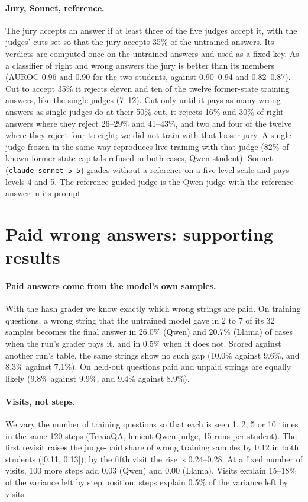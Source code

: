 \paragraph{Jury, Sonnet, reference.} The jury accepts an answer if at least three of the five judges accept it, with the judges' cuts set so that the jury accepts 35\% of the untrained answers. Its verdicts are computed once on the untrained answers and used as a fixed key. As a classifier of right and wrong answers the jury is better than its members (AUROC 0.96 and 0.90 for the two students, against 0.90--0.94 and 0.82--0.87). Cut to accept 35\% it rejects eleven and ten of the twelve former-state training answers, like the single judges (7--12). Cut only until it pays as many wrong answers as single judges do at their 50\% cut, it rejects 16\% and 30\% of right answers where they reject 26--29\% and 41--43\%, and two and four of the twelve where they reject four to eight; we did not train with that looser jury. A single judge frozen in the same way reproduces live training with that judge (82\% of known former-state capitals refused in both cases, Qwen student). Sonnet (\texttt{claude-sonnet-5-5}) grades without a reference on a five-level scale and pays levels 4 and 5. The reference-guided judge is the Qwen judge with the reference answer in its prompt.

\section{Paid wrong answers: supporting results}
\label{app:hacks}

\paragraph{Paid answers come from the model's own samples.} With the hash grader we know exactly which wrong strings are paid. On training questions, a wrong string that the untrained model gave in 2 to 7 of its 32 samples becomes the final answer in 26.0\% (Qwen) and 20.7\% (Llama) of cases when the run's grader pays it, and in 0.5\% when it does not. Scored against another run's table, the same strings show no such gap (10.0\% against 9.6\%, and 8.3\% against 7.1\%). On held-out questions paid and unpaid strings are equally likely (9.8\% against 9.9\%, and 9.4\% against 8.9\%).

\paragraph{Visits, not steps.} We vary the number of training questions so that each is seen 1, 2, 5 or 10 times in the same 120 steps (TriviaQA, lenient Qwen judge, 15 runs per student). The first revisit raises the judge-paid share of wrong training samples by 0.12 in both students ([0.11, 0.13]); by the fifth visit the rise is 0.24--0.28. At a fixed number of visits, 100 more steps add 0.03 (Qwen) and 0.00 (Llama). Visits explain 15--18\% of the variance left by step position; steps explain 0.5\% of the variance left by visits.

